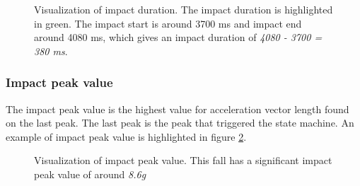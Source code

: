 \documentclass[12pt, a4paper, onecolumn]{article}
\begin{document}
	
	\begin{figure}[H]
		\centering
		\caption{Visualization of impact duration. The impact duration is highlighted in green. The impact start is around 3700 ms and impact end around 4080 ms, which gives an impact duration of \textit{4080 - 3700 = 380 ms}.}%
		\label{fig:fall-data-impact-duration}%
	\end{figure}
	
	\subsubsection{Impact peak value}
	
	The impact peak value is the highest value for acceleration vector length found on the last peak. The last peak is the peak that triggered the state machine. An example of impact peak value is highlighted in figure \ref{fig:fall-data-impact-peak}.
	
	\begin{figure}[H]
		\centering
		\caption{Visualization of impact peak value. This fall has a significant impact peak value of around \textit{8.6g}}%
		\label{fig:fall-data-impact-peak}%
	\end{figure}
	
\end{document}
